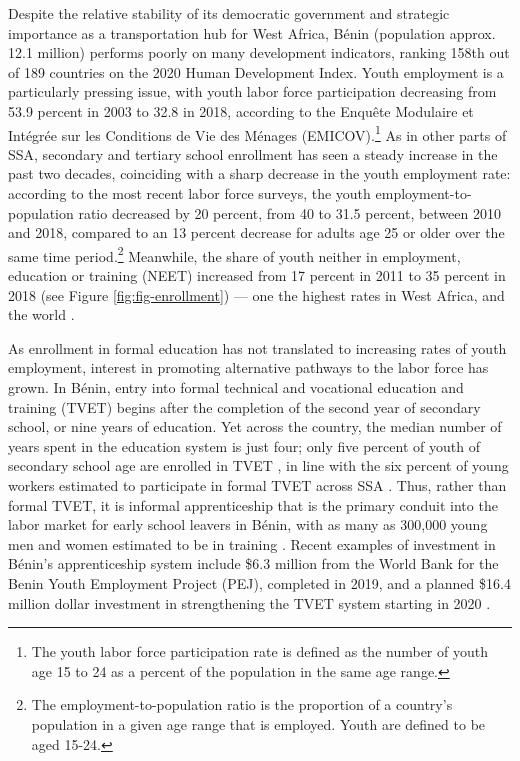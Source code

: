 \documentclass[
  a4paper, twoside, 12pt]{book}
\begin{document}
Despite the relative stability of its democratic government and strategic importance as a transportation hub for West Africa, Bénin (population approx. 12.1 million) performs poorly on many development indicators, ranking 158th out of 189 countries on the 2020 Human Development Index. Youth employment is a particularly pressing issue, with youth labor force participation decreasing from 53.9 percent in 2003 to 32.8 in 2018, according to the Enquête Modulaire et Intégrée sur les Conditions de Vie des Ménages (EMICOV).\footnote{The youth labor force participation rate is defined as the number of youth age 15 to 24 as a percent of the population in the same age range.} As in other parts of SSA, secondary and tertiary school enrollment has seen a steady increase in the past two decades, coinciding with a sharp decrease in the youth employment rate: according to the most recent labor force surveys, the youth employment-to-population ratio decreased by 20 percent, from 40 to 31.5 percent, between 2010 and 2018, compared to an 13 percent decrease for adults age 25 or older over the same time period.\footnote{The employment-to-population ratio is the proportion of a country's population in a given age range that is employed. Youth are defined to be aged 15-24.} Meanwhile, the share of youth neither in employment, education or training (NEET) increased from 17 percent in 2011 to 35 percent in 2018 (see Figure \ref{fig:fig-enrollment}) --- one the highest rates in West Africa, and the world \autocite{ilo2022}.

As enrollment in formal education has not translated to increasing rates of youth employment, interest in promoting alternative pathways to the labor force has grown. In Bénin, entry into formal technical and vocational education and training (TVET) begins after the completion of the second year of secondary school, or nine years of education. Yet across the country, the median number of years spent in the education system is just four; only five percent of youth of secondary school age are enrolled in TVET \autocite{ilo2021}, in line with the six percent of young workers estimated to participate in formal TVET across SSA \autocite{hofmann2022}. Thus, rather than formal TVET, it is informal apprenticeship that is the primary conduit into the labor market for early school leavers in Bénin, with as many as 300,000 young men and women estimated to be in training \autocite{ilo2021}. Recent examples of investment in Bénin's apprenticeship system include \$6.3 million from the World Bank for the Benin Youth Employment Project (PEJ), completed in 2019, and a planned \$16.4 million dollar investment in strengthening the TVET system starting in 2020 \autocite{worldbank2020c}.
\end{document}
